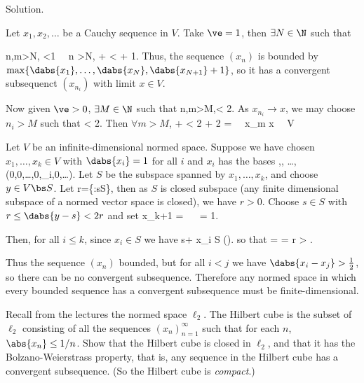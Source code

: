 Solution. \ben
\item [(a)] Let $x_1,x_2,\dots$ be a Cauchy sequence in $V$. Take $\ve=1$, then $\exists N\in\N$ such that 

\be
\forall n,m>N, \quad {} <1 \ \ra\ \forall n >N,\quad {} \leq {} +  <  + 1.
\ee
Thus, the sequence $(x_n)$ is bounded by $\max\{\dabs{x_1},\dots,\dabs{x_N},\dabs{x_{N+1}}+1\}$, so it has a convergent subsequenct $(x_{n_i})$ with limit $x\in V$. 

Now given $\ve>0$, $\exists M\in \N$ such that 
\be
\forall n,m>M,\quad {}< \frac {\ve}2.
\ee
As $x_{n_i}\to x$, we may choose $n_i > M$ such that 
\be
{} < \frac {\ve}2.
\ee
Then $\forall m>M$,
\be
{} \leq {} +  < \frac {\ve}2 + \frac{\ve}2 = \ve \ \ra \ x_m \to x \ \ra\ V 
\ee

\item [(b)] Let $V$ be an infinite-dimensional normed space. Suppose we have chosen $x_1,\dots,x_k\in V$ with $\dabs{x_i} = 1$ for all $i$ and $x_i$ has the bases
\be
{},\quad {}, \quad \dots, \quad (0,0,\dots,0,_{i},0,\dots).
\ee
Let $S$ be the subspace spanned by $x_1,\dots,x_k$, and choose $y\in V\bs S$. Let
\be
r=\inf\{:s\in S\},
\ee
then as $S$ is closed subspace (any finite dimensional subspace of a normed vector space is closed), we have $r>0$. Choose $s\in S$ with $r\leq \dabs{y-s}< 2r$ and set 
\be
x_{k+1} =  \ \ra \  = 1.
\ee

Then, for all $i\leq k$, since $x_i \in S$ we have
\be
s+ x_i \in S \quad \quad ().
\ee
so that 
\be
{} =  =   \leq {}r > .
\ee

Thus the sequence $(x_n)$ bounded, but for all $i<j$ we have $\dabs{x_i - x_j} > \frac 12$, so there can be no convergent subsequence. Therefore any normed space in which every bounded sequence has a convergent subsequence must be finite-dimensional.

\een

\begin{exercise}
Recall from the lectures the normed space $\ell_2$. The Hilbert cube is the subset of $\ell_2$ consisting of all the sequences $(x_n)^\infty_{n=1}$ such that for each $n$, $\abs{x_n} \leq 1/n$. Show that the Hilbert cube is closed in $\ell_2$, and that it has the Bolzano-Weierstrass property, that is, any sequence in the Hilbert cube has a convergent subsequence. (So the Hilbert cube is \emph{compact}.)
\end{exercise}

